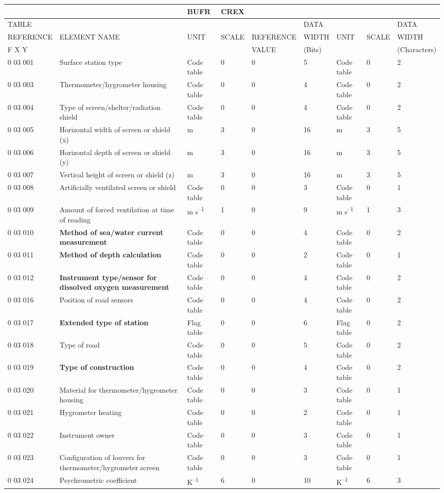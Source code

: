 \begin{longtable}[]{@{}lllllllll@{}}
\toprule
& & BUFR & CREX & & & & &\tabularnewline
\midrule
\endhead
TABLE & & & & & DATA & & & DATA\tabularnewline
REFERENCE & ELEMENT NAME & UNIT & SCALE & REFERENCE & WIDTH & UNIT & SCALE & WIDTH\tabularnewline
F X Y & & & & VALUE & (Bits) & & & (Characters)\tabularnewline
0 03 001 & Surface station type & Code table & 0 & 0 & 5 & Code table & 0 & 2\tabularnewline
0 03 003 & Thermometer/hygrometer housing & Code table & 0 & 0 & 4 & Code table & 0 & 2\tabularnewline
0 03 004 & Type of screen/shelter/radiation shield & Code table & 0 & 0 & 4 & Code table & 0 & 2\tabularnewline
0 03 005 & Horizontal width of screen or shield (x) & m & 3 & 0 & 16 & m & 3 & 5\tabularnewline
0 03 006 & Horizontal depth of screen or shield (y) & m & 3 & 0 & 16 & m & 3 & 5\tabularnewline
0 03 007 & Vertical height of screen or shield (z) & m & 3 & 0 & 16 & m & 3 & 5\tabularnewline
0 03 008 & Artificially ventilated screen or shield & Code table & 0 & 0 & 3 & Code table & 0 & 1\tabularnewline
0 03 009 & Amount of forced ventilation at time of reading & m s\textsuperscript{--1} & 1 & 0 & 9 & m s\textsuperscript{--1} & 1 & 3\tabularnewline
0 03 010 & \textbf{Method of sea/water current measurement} & Code table & 0 & 0 & 4 & Code table & 0 & 2\tabularnewline
0 03 011 & \textbf{Method of depth calculation} & Code table & 0 & 0 & 2 & Code table & 0 & 1\tabularnewline
0 03 012 & \textbf{Instrument type/sensor for dissolved oxygen measurement} & Code table & 0 & 0 & 4 & Code table & 0 & 2\tabularnewline
0 03 016 & Position of road sensors & Code table & 0 & 0 & 4 & Code table & 0 & 2\tabularnewline
0 03 017 & \textbf{Extended type of station} & Flag table & 0 & 0 & 6 & Flag table & 0 & 2\tabularnewline
0 03 018 & Type of road & Code table & 0 & 0 & 5 & Code table & 0 & 2\tabularnewline
0 03 019 & \textbf{Type of construction} & Code table & 0 & 0 & 4 & Code table & 0 & 2\tabularnewline
0 03 020 & Material for thermometer/hygrometer housing & Code table & 0 & 0 & 3 & Code table & 0 & 1\tabularnewline
0 03 021 & Hygrometer heating & Code table & 0 & 0 & 2 & Code table & 0 & 1\tabularnewline
0 03 022 & Instrument owner & Code table & 0 & 0 & 3 & Code table & 0 & 1\tabularnewline
0 03 023 & Configuration of louvers for thermometer/hygrometer screen & Code table & 0 & 0 & 3 & Code table & 0 & 1\tabularnewline
0 03 024 & Psychrometric coefficient & K\textsuperscript{--1} & 6 & 0 & 10 & K\textsuperscript{--1} & 6 & 3\tabularnewline
\bottomrule
\end{longtable}

